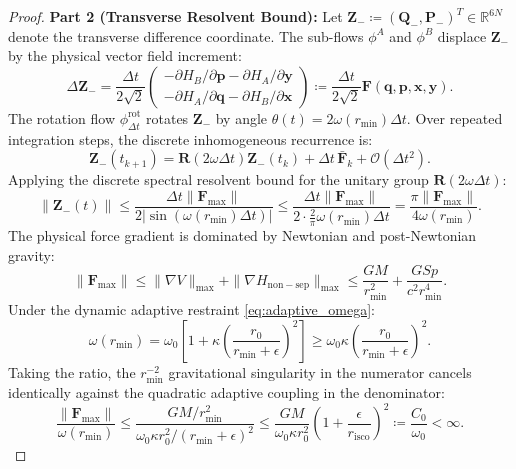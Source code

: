 \documentclass[11pt,a4paper,reqno]{article}
\theoremstyle{plain}
\theoremstyle{definition}
\theoremstyle{remark}
\numberwithin{equation}{section}
\begin{document}
\begin{proof}
\textbf{Part 2 (Transverse Resolvent Bound):} Let $\bm{Z}_- \coloneqq (\bm{Q}_-, \bm{P}_-)^T \in \mathbb{R}^{6N}$ denote the transverse difference coordinate. The sub-flows $\phi^A$ and $\phi^B$ displace $\bm{Z}_-$ by the physical vector field increment:
\begin{equation}
\Delta \bm{Z}_- = \frac{\Delta t}{2 \sqrt{2}} \begin{pmatrix} -\partial H_B / \partial \bm{p} - \partial H_A / \partial \bm{y} \\ -\partial H_A / \partial \bm{q} - \partial H_B / \partial \bm{x} \end{pmatrix} \coloneqq \frac{\Delta t}{2 \sqrt{2}} \bm{F}(\bm{q}, \bm{p}, \bm{x}, \bm{y}).
\end{equation}
The rotation flow $\phi_{\Delta t}^{\mathrm{rot}}$ rotates $\bm{Z}_-$ by angle $\theta(t) = 2 \omega(r_{\min}) \Delta t$. Over repeated integration steps, the discrete inhomogeneous recurrence is:
\begin{equation}
\bm{Z}_-(t_{k+1}) = \bm{R}(2\omega \Delta t) \bm{Z}_-(t_k) + \Delta t \, \bar{\bm{F}}_k + \mathcal{O}(\Delta t^2).
\end{equation}
Applying the discrete spectral resolvent bound for the unitary group $\bm{R}(2\omega \Delta t)$:
\begin{equation}
\|\bm{Z}_-(t)\| \le \frac{\Delta t \|\bm{F}_{\max}\|}{2 |\sin(\omega(r_{\min}) \Delta t)|} \le \frac{\Delta t \|\bm{F}_{\max}\|}{2 \cdot \frac{2}{\pi} \omega(r_{\min}) \Delta t} = \frac{\pi \|\bm{F}_{\max}\|}{4 \omega(r_{\min})}.
\label{eq:resolvent_bound}
\end{equation}
The physical force gradient is dominated by Newtonian and post-Newtonian gravity:
\begin{equation}
\|\bm{F}_{\max}\| \le \|\nabla V\|_{\max} + \|\nabla H_{\mathrm{non-sep}}\|_{\max} \le \frac{G M}{r_{\min}^2} + \frac{G S p}{c^2 r_{\min}^4}.
\end{equation}
Under the dynamic adaptive restraint \eqref{eq:adaptive_omega}:
\begin{equation}
\omega(r_{\min}) = \omega_0 \left[ 1 + \kappa \left( \frac{r_0}{r_{\min} + \epsilon} \right)^2 \right] \ge \omega_0 \kappa \left( \frac{r_0}{r_{\min} + \epsilon} \right)^2.
\end{equation}
Taking the ratio, the $r_{\min}^{-2}$ gravitational singularity in the numerator cancels identically against the quadratic adaptive coupling in the denominator:
\begin{equation}
\frac{\|\bm{F}_{\max}\|}{\omega(r_{\min})} \le \frac{G M / r_{\min}^2}{\omega_0 \kappa r_0^2 / (r_{\min} + \epsilon)^2} \le \frac{G M}{\omega_0 \kappa r_0^2} \left( 1 + \frac{\epsilon}{r_{\mathrm{isco}}} \right)^2 \coloneqq \frac{C_0}{\omega_0} < \infty.

\end{equation}
\end{proof}
\end{document}
